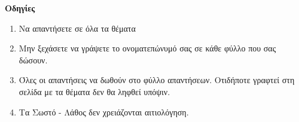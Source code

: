 \documentclass[12pt]{article}
\begin{document}
\vspace*{\fill}
\textbf{Οδηγίες}
\begin{enumerate}
 \item Να απαντήσετε σε όλα τα θέματα
 \item Μην ξεχάσετε να γράψετε το ονοματεπώνυμό σας σε κάθε φύλλο που σας δώσουν.
 \item Όλες οι απαντήσεις να δωθούν στο φύλλο απαντήσεων. Οτιδήποτε γραφτεί στη σελίδα με τα θέματα δεν θα ληφθεί υπόψιν.
 \item Τα Σωστό - Λάθος δεν χρειάζονται αιτιολόγηση.
\end{enumerate}
\end{document}
